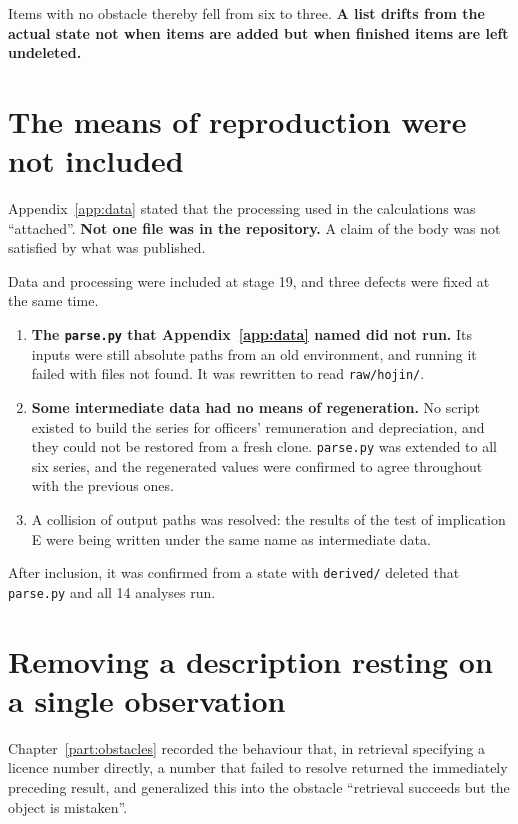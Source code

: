 Items with no obstacle thereby fell from six to three. \textbf{A list drifts from the actual state
not when items are added but when finished items are left undeleted.}

\section{The means of reproduction were not included}

Appendix~\ref{app:data} stated that the processing used in the calculations was ``attached''.
\textbf{Not one file was in the repository.} A claim of the body was not satisfied by what was
published.

Data and processing were included at stage 19, and three defects were fixed at the same time.

\begin{enumerate}[label=(\arabic*)]
\item \textbf{The \texttt{parse.py} that Appendix~\ref{app:data} named did not run.} Its inputs
were still absolute paths from an old environment, and running it failed with files not found. It
was rewritten to read \texttt{raw/hojin/}.

\item \textbf{Some intermediate data had no means of regeneration.} No script existed to build the
series for officers' remuneration and depreciation, and they could not be restored from a fresh
clone. \texttt{parse.py} was extended to all six series, and the regenerated values were confirmed
to agree throughout with the previous ones.

\item A collision of output paths was resolved: the results of the test of implication E were
being written under the same name as intermediate data.
\end{enumerate}

After inclusion, it was confirmed from a state with \texttt{derived/} deleted that
\texttt{parse.py} and all 14 analyses run.

\section{Removing a description resting on a single observation}

Chapter~\ref{part:obstacles} recorded the behaviour that, in retrieval specifying a licence number
directly, a number that failed to resolve returned the immediately preceding result, and
generalized this into the obstacle ``retrieval succeeds but the object is mistaken''.

